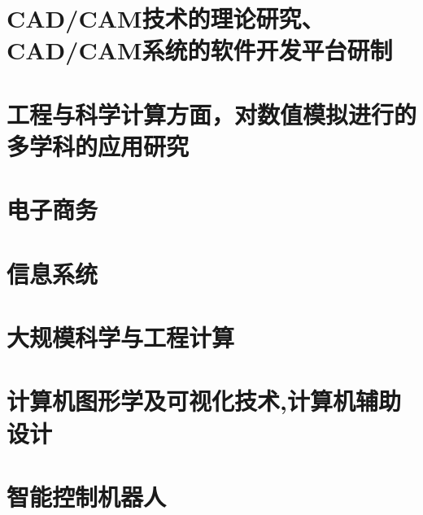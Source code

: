\section{CAD/CAM技术的理论研究、CAD/CAM系统的软件开发平台研制}
\section{工程与科学计算方面，对数值模拟进行的多学科的应用研究}
\section{电子商务}
\section{信息系统}
\section{大规模科学与工程计算}
\section{计算机图形学及可视化技术,计算机辅助设计}
\section{智能控制机器人}
